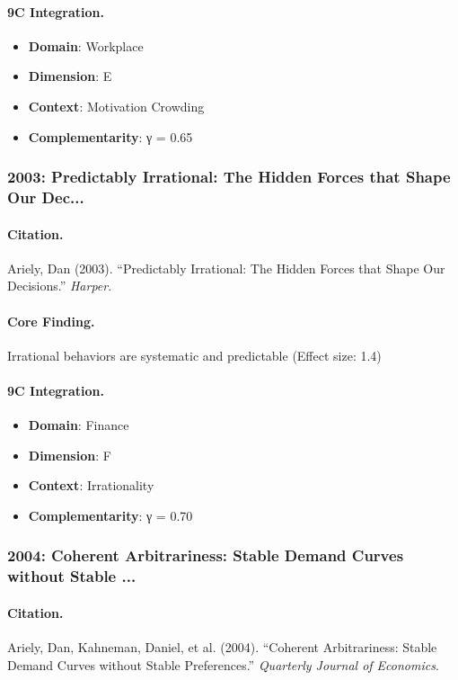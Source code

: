 \paragraph{9C Integration.}
\begin{itemize}[nosep]
  \item \textbf{Domain}: Workplace
  \item \textbf{Dimension}: E
  \item \textbf{Context}: Motivation Crowding
  \item \textbf{Complementarity}: γ = 0.65
\end{itemize}

\subsubsection{2003: Predictably Irrational: The Hidden Forces that Shape Our Dec...}

\paragraph{Citation.}
Ariely, Dan (2003). ``Predictably Irrational: The Hidden Forces that Shape Our Decisions.''
\textit{Harper}.

\paragraph{Core Finding.}
Irrational behaviors are systematic and predictable (Effect size: 1.4)

\paragraph{9C Integration.}
\begin{itemize}[nosep]
  \item \textbf{Domain}: Finance
  \item \textbf{Dimension}: F
  \item \textbf{Context}: Irrationality
  \item \textbf{Complementarity}: γ = 0.70
\end{itemize}

\subsubsection{2004: Coherent Arbitrariness: Stable Demand Curves without Stable ...}

\paragraph{Citation.}
Ariely, Dan, Kahneman, Daniel, et al. (2004). ``Coherent Arbitrariness: Stable Demand Curves without Stable Preferences.''
\textit{Quarterly Journal of Economics}.

